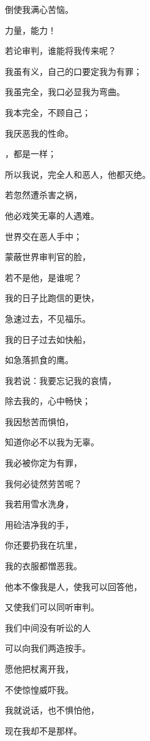 {\par }{\Q 倒使我满心苦恼。
\par }{\Q {}力量，{}能力！
\par }{\Q 若论审判，{}谁能将我传来呢？
\par }{\Q {}我虽有义，自己的口要定我为有罪；
\par }{\Q 我虽完全，我口必显我为弯曲。
\par }{\Q {}我本完全，不顾自己；
\par }{\Q 我厌恶我的性命。
\par }{\Q {}，都是一样；
\par }{\Q 所以我说，完全人和恶人，他都灭绝。
\par }{\Q {}若忽然遭杀害之祸，
\par }{\Q 他必戏笑无辜的人遇难。
\par }{\Q {}世界交在恶人手中；
\par }{\Q 蒙蔽世界审判官的脸，
\par }{\Q 若不是他，是谁呢？
\par }{\BB \par }{\Q {}我的日子比跑信的更快，
\par }{\Q 急速过去，不见福乐。
\par }{\Q {}我的日子过去如快船，
\par }{\Q 如急落抓食的鹰。
\par }{\Q {}我若说：我要忘记我的哀情，
\par }{\Q 除去我的{}，心中畅快；
\par }{\Q {}我因愁苦而惧怕，
\par }{\Q 知道你必不以我为无辜。
\par }{\Q {}我必被你定为有罪，
\par }{\Q 我何必徒然劳苦呢？
\par }{\Q {}我若用雪水洗身，
\par }{\Q 用硷洁净我的手，
\par }{\Q {}你还要扔我在坑里，
\par }{\Q 我的衣服都憎恶我。
\par }{\Q {}他本不像我是人，使我可以回答他，
\par }{\Q 又使我们可以同听审判。
\par }{\Q {}我们中间没有听讼的人
\par }{\Q 可以向我们两造按手。
\par }{\Q {}愿他把杖离开我，
\par }{\Q 不使惊惶威吓我。
\par }{\Q {}我就说话，也不惧怕他，
\par }{\Q 现在我却不是那样。

}
